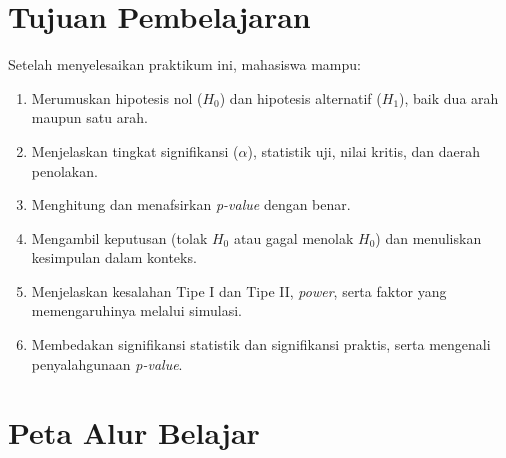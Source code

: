 \documentclass[
  indonesian,
  letterpaper,
]{book}
\providecommand{\tightlist}{%
  \setlength{\itemsep}{0pt}\setlength{\parskip}{0pt}}
\begin{document}
\section{Tujuan Pembelajaran}\label{tujuan-pembelajaran-1}

Setelah menyelesaikan praktikum ini, mahasiswa mampu:

\begin{enumerate}
\def\labelenumi{\arabic{enumi}.}
\tightlist
\item
  Merumuskan hipotesis nol (\(H_0\)) dan hipotesis alternatif (\(H_1\)),
  baik dua arah maupun satu arah.
\item
  Menjelaskan tingkat signifikansi (\(\alpha\)), statistik uji, nilai
  kritis, dan daerah penolakan.
\item
  Menghitung dan menafsirkan \emph{p-value} dengan benar.
\item
  Mengambil keputusan (tolak \(H_0\) atau gagal menolak \(H_0\)) dan
  menuliskan kesimpulan dalam konteks.
\item
  Menjelaskan kesalahan Tipe I dan Tipe II, \emph{power}, serta faktor
  yang memengaruhinya melalui simulasi.
\item
  Membedakan signifikansi statistik dan signifikansi praktis, serta
  mengenali penyalahgunaan \emph{p-value}.
\end{enumerate}

\section{Peta Alur Belajar}\label{peta-alur-belajar-1}
\end{document}
